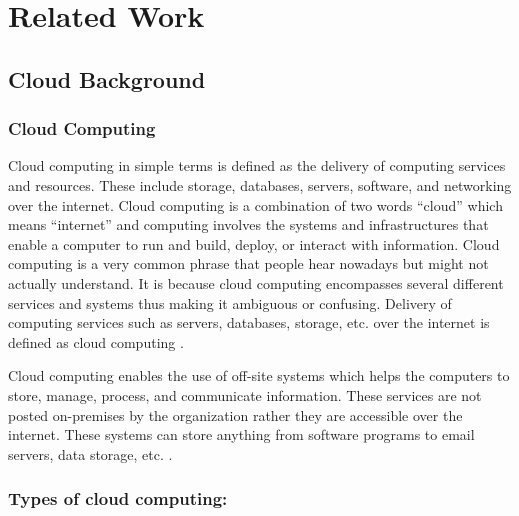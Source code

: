 
\chapter{Related Work}

\section{Cloud Background}

\subsection{Cloud Computing}
Cloud computing in simple terms is defined as the delivery of computing services and resources.
These include
storage, databases, servers, software, and networking over the internet.
Cloud computing is a combination of two
words “cloud” which means “internet” and computing involves the systems and infrastructures that enable a computer to run and build, deploy, or interact with information.
Cloud computing is a very common phrase that people hear nowadays but might not actually understand.
It is because cloud computing encompasses several different services and systems thus making it ambiguous or confusing.
Delivery of computing services such as servers, databases, storage, etc.
over the internet is defined as cloud computing \cite{11}.

Cloud computing enables the use of off-site systems which helps the computers to store, manage, process, and
communicate information.
These services are not posted on-premises by the
organization rather they are accessible over the internet.
These systems can store anything from software programs
to email servers, data storage, etc. \cite{11}
\cite{12}.

\subsection{Types of cloud computing:}

